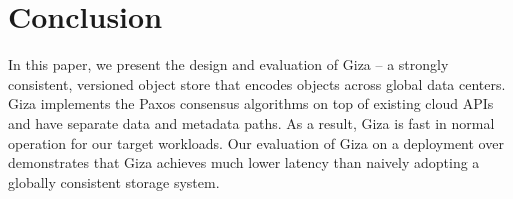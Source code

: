 \section{Conclusion}

In this paper, we present the design and evaluation of Giza -- a strongly
consistent, versioned object store that encodes objects across global data
centers. Giza implements the Paxos consensus algorithms on top of existing cloud
APIs and have separate data and metadata paths. As a result, Giza is fast in
normal operation for our target workloads. Our evaluation of Giza on a
deployment over \deployment demonstrates that Giza achieves much lower latency
than naively adopting a globally consistent storage system.


